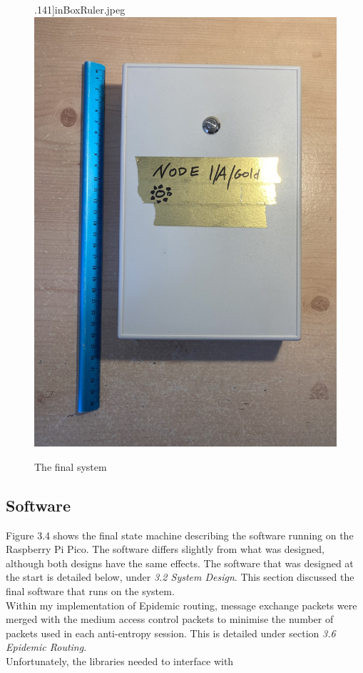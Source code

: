 \documentclass[12pt,a4paper]{report}
\begin{document}
\begin{figure}[h]
\begin{center}
.141]{inBoxRuler.jpeg}    \includegraphics[scale=0.147]{outBoxRuler.jpeg}
\end{center}
\caption{The final system}
\end{figure}
\FloatBarrier

\subsection{Software}
Figure 3.4 shows the final state machine describing the software running on the Raspberry Pi Pico. The software differs slightly from what was designed, although both designs have the same effects. The software that was designed at the start is detailed below, under \emph{3.2 System Design}. This section discussed the final software that runs on the system. \\ 
Within my implementation of Epidemic routing, message exchange packets were merged with the medium access control packets to minimise the number of packets used in each anti-entropy session. This is detailed under section \emph{3.6 Epidemic Routing}. \\
Unfortunately, the libraries needed to interface with 
\end{document}
